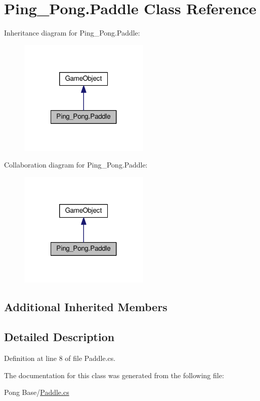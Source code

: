 \hypertarget{class_ping___pong_1_1_paddle}{\section{Ping\-\_\-\-Pong.\-Paddle Class Reference}
\label{class_ping___pong_1_1_paddle}
}


Inheritance diagram for Ping\-\_\-\-Pong.\-Paddle\-:
\nopagebreak
\begin{figure}[H]
\begin{center}
\leavevmode
\includegraphics[width=176pt]{class_ping___pong_1_1_paddle__inherit__graph}
\end{center}
\end{figure}


Collaboration diagram for Ping\-\_\-\-Pong.\-Paddle\-:
\nopagebreak
\begin{figure}[H]
\begin{center}
\leavevmode
\includegraphics[width=176pt]{class_ping___pong_1_1_paddle__coll__graph}
\end{center}
\end{figure}
\subsection*{Additional Inherited Members}


\subsection{Detailed Description}


Definition at line 8 of file Paddle.\-cs.



The documentation for this class was generated from the following file\-:\begin{DoxyCompactItemize}
\item 
Pong Base/\hyperlink{_paddle_8cs}{Paddle.\-cs}\end{DoxyCompactItemize}
